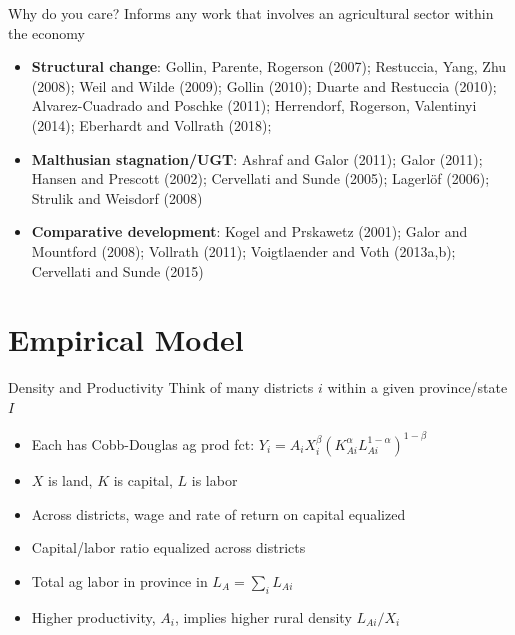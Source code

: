 \documentclass[10pt, xcolor=dvipsnames]{beamer}
\begin{document}
\begin{frame}{Why do you care?}
Informs any work that involves an agricultural sector within the economy

\begin{itemize}
  \item \textbf{Structural change}: Gollin, Parente, Rogerson (2007); Restuccia, Yang, Zhu (2008); Weil and Wilde (2009); Gollin (2010); Duarte and Restuccia (2010); Alvarez-Cuadrado and Poschke (2011); Herrendorf, Rogerson, Valentinyi (2014); Eberhardt and Vollrath (2018); 
  \item \textbf{Malthusian stagnation/UGT}: Ashraf and Galor (2011); Galor (2011); Hansen and Prescott (2002); Cervellati and Sunde (2005); Lagerl{\"o}f (2006); Strulik and Weisdorf (2008)
  \item \textbf{Comparative development}: Kogel and Prskawetz (2001); Galor and Mountford (2008); Vollrath (2011); Voigtlaender and Voth (2013a,b); Cervellati and Sunde (2015)
\end{itemize}

\end{frame}

\section{Empirical Model}

\begin{frame}{Density and Productivity}
Think of many districts $i$ within a given province/state $I$
\begin{itemize}
  \item Each has Cobb-Douglas ag prod fct: $Y_{i} = A_{i} X_{i}^{\beta} \left(K_{Ai}^{\alpha}L_{Ai}^{1-\alpha}\right)^{1-\beta}$
  \item $X$ is land, $K$ is capital, $L$ is labor
  \item Across districts, wage and rate of return on capital equalized
  \item Capital/labor ratio equalized across districts
  \item Total ag labor in province in $L_A = \sum_i L_{Ai}$
  \item Higher productivity, $A_i$, implies higher rural density $L_{Ai}/X_i$
\end{itemize}
\end{frame}
\end{document}
